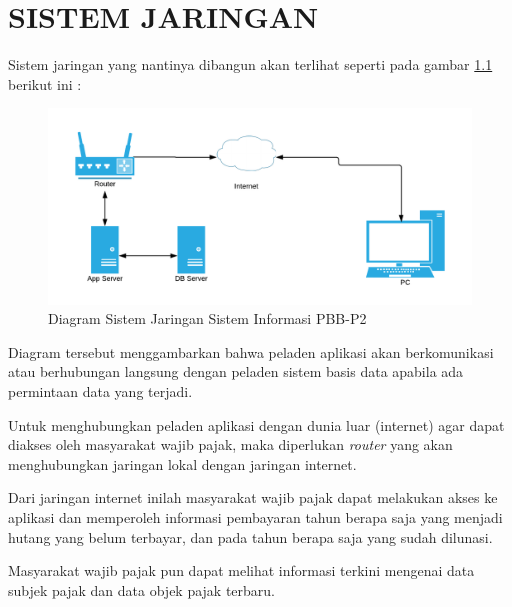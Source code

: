 \chapter{SISTEM JARINGAN}

Sistem jaringan yang nantinya dibangun akan terlihat seperti pada gambar \ref{fig:network-dia} berikut ini :

\begin{figure}[H]
	\centering
	\includegraphics[width=1\textwidth]{./resources/network-diagram}
	\caption{Diagram Sistem Jaringan Sistem Informasi PBB-P2}
	\label{fig:network-dia}
\end{figure}

Diagram tersebut menggambarkan bahwa peladen aplikasi akan berkomunikasi atau berhubungan langsung dengan peladen sistem basis data apabila ada permintaan data yang terjadi.

Untuk menghubungkan peladen aplikasi dengan dunia luar (internet) agar dapat diakses oleh masyarakat wajib pajak, maka diperlukan \textit{router} yang akan menghubungkan jaringan lokal dengan jaringan internet.

Dari jaringan internet inilah masyarakat wajib pajak dapat melakukan akses ke aplikasi dan memperoleh informasi pembayaran tahun berapa saja yang menjadi hutang yang belum terbayar, dan pada tahun berapa saja yang sudah dilunasi.

Masyarakat wajib pajak pun dapat melihat informasi terkini mengenai data subjek pajak dan data objek pajak terbaru.